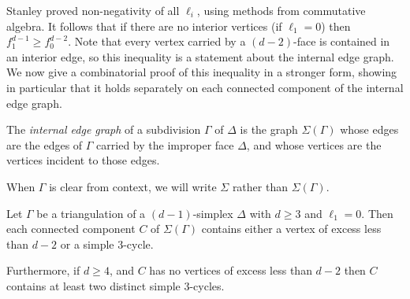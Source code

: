 \documentclass[ALCO,ThmDefs,Unicode,epreuves]{cedram}
\begin{document}
Stanley proved non-negativity of all $\ell_i$, using methods from commutative algebra. 
It follows that if there are no interior vertices (\ie if $\ell_1 = 0$) then 
$f_1^{d-1} \geq f_0^{d-2}$. Note that every vertex carried by a $(d-2)$-face is contained 
in an interior edge, so this inequality is a statement about the internal edge graph. 
We now give a combinatorial proof of this inequality in a stronger form, showing in particular
that it holds separately on each connected component of the internal edge graph.


\begin{defi}
The \emph{internal edge graph} of a subdivision $\Gamma$ of $\Delta$ is the graph
$\Sigma(\Gamma)$ whose edges are the edges of $\Gamma$ carried by the improper face $\Delta$,
and whose vertices are the vertices incident to those edges. 
\end{defi}

\noindent When $\Gamma$ is clear from context, we will write $\Sigma$ rather than $\Sigma(\Gamma)$. 

\begin{prop}\label{prop:each component has a low excess or low chi}
Let $\Gamma$ be a triangulation of a $(d - 1)$-simplex $\Delta$ with $d \geq 3$ and 
$\ell_1 = 0$.
Then each connected component $C$ of $\Sigma(\Gamma)$ contains either a vertex of excess
less than $d-2$ or a simple $3$-cycle. 

Furthermore, if $d \geq 4$, and $C$ has no vertices of excess less than $d-2$ then 
$C$ contains at least two distinct simple $3$-cycles. 
\end{prop}
\end{document}
